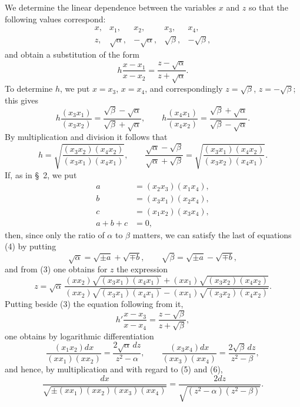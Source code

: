 \documentclass[11pt]{article}
\begin{document}
We determine the linear dependence between the variables $x$ and $z$ so that the following values correspond:
\begin{equation}
\begin{array}{ccccc}
x,&x_1,&x_2,&x_3,&x_4,\\
z,&\sqrt{\alpha},&-\sqrt{\alpha},&\sqrt{\beta},&-\sqrt{\beta},
\end{array}
\tag{2}
\end{equation}
and obtain a substitution of the form
\begin{equation}
h\frac{x-x_1}{x-x_2}=\frac{z-\sqrt{\alpha}}{z+\sqrt{\alpha}}.
\tag{3}
\end{equation}
To determine $h$, we put $x=x_3$, $x=x_4$, and correspondingly $z=\sqrt{\beta}$, $z=-\sqrt{\beta}$; this gives
\[
h\frac{(x_3x_1)}{(x_3x_2)}=\frac{\sqrt{\beta}-\sqrt{\alpha}}{\sqrt{\beta}+\sqrt{\alpha}},\qquad
h\frac{(x_4x_1)}{(x_4x_2)}=\frac{\sqrt{\beta}+\sqrt{\alpha}}{\sqrt{\beta}-\sqrt{\alpha}}.
\]
By multiplication and division it follows that
\begin{equation}
h=\sqrt{\frac{(x_3x_2)(x_4x_2)}{(x_3x_1)(x_4x_1)}},\qquad
\frac{\sqrt{\alpha}-\sqrt{\beta}}{\sqrt{\alpha}+\sqrt{\beta}}=
\sqrt{\frac{(x_3x_1)(x_4x_2)}{(x_3x_2)(x_4x_1)}}.
\tag{4}
\end{equation}
If, as in \S~2, we put
\begin{equation}
\begin{aligned}
a&=(x_2x_3)(x_1x_4),\\
b&=(x_3x_1)(x_2x_4),\\
c&=(x_1x_2)(x_3x_4),\\
a+b+c&=0,
\end{aligned}
\tag{5}
\end{equation}
then, since only the ratio of $\alpha$ to $\beta$ matters, we can satisfy the last of equations (4) by putting
\begin{equation}
\sqrt{\alpha}=\sqrt{\pm a}+\sqrt{\mp b},\qquad
\sqrt{\beta}=\sqrt{\pm a}-\sqrt{\mp b},
\tag{6}
\end{equation}
and from (3) one obtains for $z$ the expression
\begin{equation}
z=\sqrt{\alpha}\,
\frac{(xx_2)\sqrt{(x_3x_1)(x_4x_1)}+(xx_1)\sqrt{(x_3x_2)(x_4x_2)}}
{(xx_2)\sqrt{(x_3x_1)(x_4x_1)}-(xx_1)\sqrt{(x_3x_2)(x_4x_2)}}.
\tag{7}
\end{equation}
Putting beside (3) the equation following from it,
\[
h'\frac{x-x_3}{x-x_4}=\frac{z-\sqrt{\beta}}{z+\sqrt{\beta}},
\]
one obtains by logarithmic differentiation
\[
\frac{(x_1x_2)dx}{(xx_1)(xx_2)}=\frac{2\sqrt{\alpha}\,dz}{z^2-\alpha},\qquad
\frac{(x_3x_4)dx}{(xx_3)(xx_4)}=\frac{2\sqrt{\beta}\,dz}{z^2-\beta},
\]
and hence, by multiplication and with regard to (5) and (6),
\begin{equation}
\frac{dx}{\sqrt{\pm (xx_1)(xx_2)(xx_3)(xx_4)}}=
\frac{2dz}{\sqrt{(z^2-\alpha)(z^2-\beta)}}.
\tag{8}
\end{equation}
\end{document}
